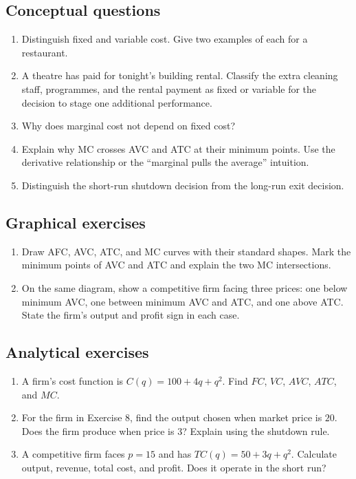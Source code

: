 \subsection*{Conceptual questions}
\begin{enumerate}[label=\arabic*.]
  \item Distinguish fixed and variable cost. Give two examples of each for a restaurant.
  \item A theatre has paid for tonight's building rental. Classify the extra
  cleaning staff, programmes, and the rental payment as fixed or variable for
  the decision to stage one additional performance.
  \item Why does marginal cost not depend on fixed cost?
  \item Explain why MC crosses AVC and ATC at their minimum points. Use the
  derivative relationship or the “marginal pulls the average” intuition.
  \item Distinguish the short-run shutdown decision from the long-run exit decision.
\end{enumerate}

\subsection*{Graphical exercises}
\begin{enumerate}[resume,label=\arabic*.]
  \item Draw AFC, AVC, ATC, and MC curves with their standard shapes. Mark the
  minimum points of AVC and ATC and explain the two MC intersections.
  \item On the same diagram, show a competitive firm facing three prices: one
  below minimum AVC, one between minimum AVC and ATC, and one above ATC. State
  the firm's output and profit sign in each case.
\end{enumerate}

\subsection*{Analytical exercises}
\begin{enumerate}[resume,label=\arabic*.]
  \item A firm's cost function is $C(q)=100+4q+q^2$. Find $FC$, $VC$, $AVC$,
  $ATC$, and $MC$.
  \item For the firm in Exercise 8, find the output chosen when market price is
  $20$. Does the firm produce when price is $3$? Explain using the shutdown rule.
  \item A competitive firm faces $p=15$ and has $TC(q)=50+3q+q^2$. Calculate
  output, revenue, total cost, and profit. Does it operate in the short run?
\end{enumerate}


